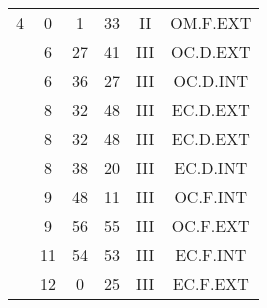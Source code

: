 \documentclass[12pt, a4paper]{article}
\begin{document}
\begin{multicols}{3}
{\begin{tabular}{c c c c c c}
	 	 	 	4 & 0 & 1 & 33 & II & OM.F.EXT\\%
	 	 	 	 & 6 & 27 & 41 & III & OC.D.EXT\\%
	 	 	 	 & 6 & 36 & 27 & III & OC.D.INT\\%
	 	 	 	 & 8 & 32 & 48 & III & EC.D.EXT\\%
	 	 	 	 & 8 & 32 & 48 & III & EC.D.EXT\\%
	 	 	 	 & 8 & 38 & 20 & III & EC.D.INT\\%
	 	 	 	 & 9 & 48 & 11 & III & OC.F.INT\\%
	 	 	 	 & 9 & 56 & 55 & III & OC.F.EXT\\%
	 	 	 	 & 11 & 54 & 53 & III & EC.F.INT\\%
	 	 	 	 & 12 & 0 & 25 & III & EC.F.EXT\\%
	 	 \end{tabular}
 	}
\end{multicols}
\end{document}
